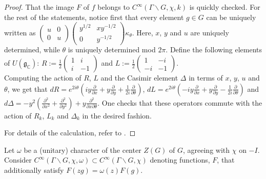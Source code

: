\begin{proof}
That the image $F$ of $f$ belongs to $C^{\infty}(\Gamma \backslash G, \chi, k)$ is quickly checked. For the rest of the statements, notice first that every element $g \in G$ can be uniquely written as $ \begin{pmatrix}  u & 0 \\ 0& u \end{pmatrix}  \begin{pmatrix}  y^{1/2} & xy^{-1/2} \\ 0& y^{-1/2} \end{pmatrix} \kappa_{\theta}$. Here, $x$, $y$ and $u$ are uniquely determined, while $\theta$ is uniquely determined mod $2\pi$. Define the following elements of $U(\mathfrak{g}_\mathbb{C})$: $R := \frac{1}{2} \begin{pmatrix}  1 & i \\ i& -1 \end{pmatrix}$ and $L := \frac{1}{2} \begin{pmatrix}  1 & -i \\ -i & -1 \end{pmatrix}$.\\

Computing the action of $R$, $L$ and the Casimir element $\Delta$ in terms of $x$, $y$, $u$ and $\theta$, we get that
$dR = e^{2i\theta} (iy \frac{\partial}{\partial x} + y\frac{\partial}{\partial y} + \frac{1}{2i} \frac{\partial}{\partial \theta})$, $dL = e^{2i\theta} (-iy \frac{\partial}{\partial x} + y\frac{\partial}{\partial y} - \frac{1}{2i} \frac{\partial}{\partial \theta})$ and $d\Delta = -y^{2}(\frac{\partial^{2}}{\partial x^{2}} + \frac{\partial^{2}}{\partial y^{2}}) + y\frac{\partial ^{2}}{\partial x \partial \theta} $. One checks that these operators commute with the action of $R_k$, $L_k$ and $\Delta_k$ in the desired fashion.

For details of the calculation, refer to \cite[Theorem 2.2.5]{Bump}.
\end{proof}


Let $\omega$ be a (unitary) character of the center $Z(G)$ of $G$, agreeing with $\chi$ on $-I$. Consider  $C^{\infty}(\Gamma \backslash G, \chi, \omega) \subset C^{\infty}(\Gamma \backslash G, \chi)$ denoting functions, $F$, that additionally satisfy $F(zg) = \omega(z)F(g)$.

